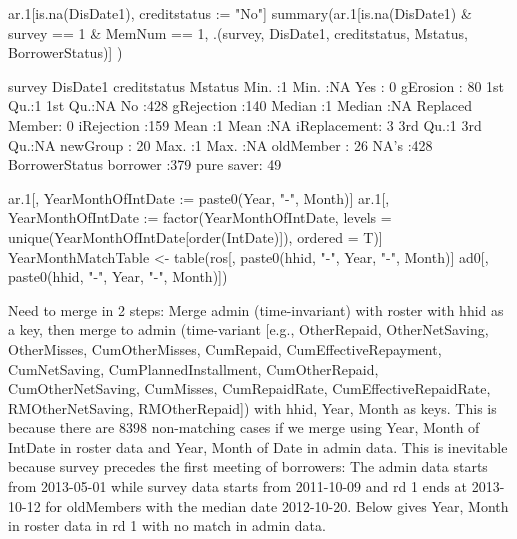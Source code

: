 \begin{Schunk}
\begin{Sinput}
ar.1[is.na(DisDate1), creditstatus := "No"]
summary(ar.1[is.na(DisDate1) & survey == 1 & MemNum == 1, 
  .(survey, DisDate1, creditstatus, Mstatus, BorrowerStatus)] )
\end{Sinput}
\begin{Soutput}
     survey     DisDate1            creditstatus         Mstatus   
 Min.   :1   Min.   :NA    Yes            :  0   gErosion    : 80  
 1st Qu.:1   1st Qu.:NA    No             :428   gRejection  :140  
 Median :1   Median :NA    Replaced Member:  0   iRejection  :159  
 Mean   :1   Mean   :NA                          iReplacement:  3  
 3rd Qu.:1   3rd Qu.:NA                          newGroup    : 20  
 Max.   :1   Max.   :NA                          oldMember   : 26  
             NA's   :428                                           
    BorrowerStatus
 borrower  :379   
 pure saver: 49   
                  
                  
                  
                  
                  
\end{Soutput}
\end{Schunk}
\begin{Schunk}
\begin{Sinput}
ar.1[, YearMonthOfIntDate := paste0(Year, "-", Month)]
ar.1[, YearMonthOfIntDate := factor(YearMonthOfIntDate, 
  levels = unique(YearMonthOfIntDate[order(IntDate)]), ordered = T)]
YearMonthMatchTable <- table(ros[, paste0(hhid, "-", Year, "-", Month)] %in% 
    ad0[, paste0(hhid, "-", Year, "-", Month)])
\end{Sinput}
\end{Schunk}
Need to merge in 2 steps: Merge admin (time-invariant) with roster with \textsf{hhid} as a key, then merge to admin (time-variant {\footnotesize [e.g., OtherRepaid, OtherNetSaving, OtherMisses, CumOtherMisses, CumRepaid, CumEffectiveRepayment, CumNetSaving, CumPlannedInstallment, CumOtherRepaid, CumOtherNetSaving, CumMisses, CumRepaidRate, CumEffectiveRepaidRate, RMOtherNetSaving, RMOtherRepaid]}) with \textsf{hhid, Year, Month} as keys. This is because there are 8398 non-matching cases if we merge using \textsf{Year, Month} of \textsf{IntDate} in roster data and \textsf{Year, Month} of \textsf{Date} in admin data. This is inevitable because survey precedes the first meeting of borrowers: The admin data starts from 2013-05-01 while survey data starts from 2011-10-09 and rd 1 ends at 2013-10-12 for \textsf{oldMember}s with the median date 2012-10-20. Below gives \textsf{Year, Month} in roster data in rd 1 with no match in admin data.

